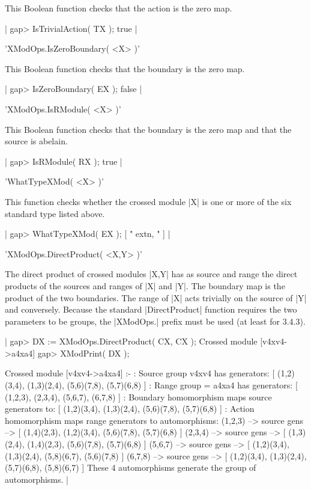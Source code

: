 This Boolean function checks that the action is the zero map.

|    gap> IsTrivialAction( TX );
    true |

%

'XModOps.IsZeroBoundary( <X> )'

This Boolean function checks that the boundary is the zero map.

|    gap> IsZeroBoundary( EX );
    false |

%

'XModOps.IsRModule( <X> )'

This Boolean function checks that
the boundary is the zero map and that the source is abelain.

|    gap> IsRModule( RX );
    true |

%

'WhatTypeXMod( <X> )'

This function checks whether the crossed module |X| is one or more of the 
six standard type listed above.

|    gap> WhatTypeXMod( EX );
    [ " extn, " ]  |

%

'XModOps.DirectProduct( <X,Y> )'

The direct product of crossed modules |X,Y| has as source and range
the direct products of the sources and ranges of |X| and |Y|.
The boundary map is the product of the two boundaries.
The range of |X| acts trivially on the source of |Y| and conversely.
Because the standard |DirectProduct| function requires the two
parameters to be groups, the |XModOps.| prefix must be used
(at least for {\GAP}3.4.3).

|    gap> DX := XModOps.DirectProduct( CX, CX );
    Crossed module [v4xv4->a4xa4]
    gap> XModPrint( DX );

    Crossed module [v4xv4->a4xa4] :- 
    : Source group v4xv4 has generators:
      [ (1,2)(3,4), (1,3)(2,4), (5,6)(7,8), (5,7)(6,8) ]
    : Range group = a4xa4 has generators:
      [ (1,2,3), (2,3,4), (5,6,7), (6,7,8) ]
    : Boundary homomorphism maps source generators to:
      [ (1,2)(3,4), (1,3)(2,4), (5,6)(7,8), (5,7)(6,8) ]
    : Action homomorphism maps range generators to automorphisms:
      (1,2,3) --> { source gens -->
          [ (1,4)(2,3), (1,2)(3,4), (5,6)(7,8), (5,7)(6,8) ] }
      (2,3,4) --> { source gens -->
          [ (1,3)(2,4), (1,4)(2,3), (5,6)(7,8), (5,7)(6,8) ] }
      (5,6,7) --> { source gens -->
          [ (1,2)(3,4), (1,3)(2,4), (5,8)(6,7), (5,6)(7,8) ] }
      (6,7,8) --> { source gens -->
          [ (1,2)(3,4), (1,3)(2,4), (5,7)(6,8), (5,8)(6,7) ] }
      These 4 automorphisms generate the group of automorphisms. |


